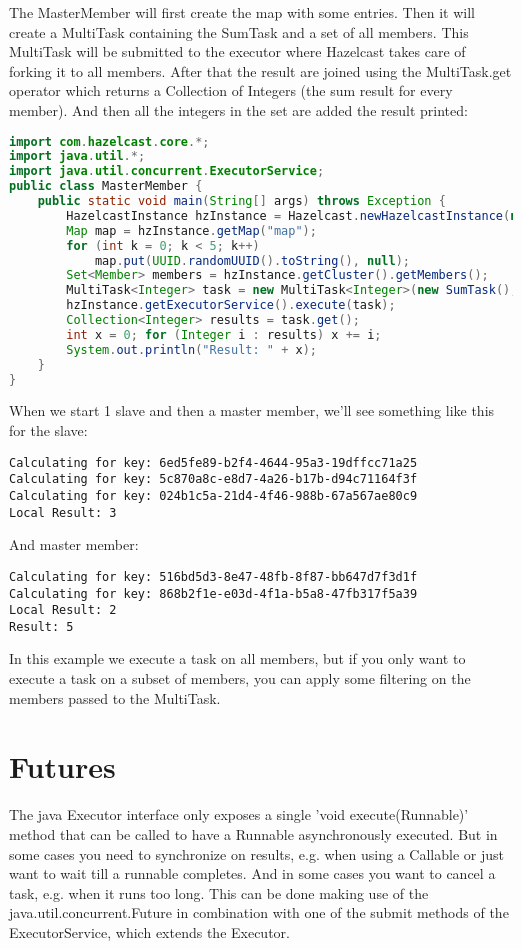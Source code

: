 The MasterMember will first create the map with some entries. Then it will create a MultiTask containing the SumTask and a set of all members. This MultiTask will be submitted to the executor where Hazelcast takes care of forking it to all members. After that the result are joined using the MultiTask.get operator which returns a Collection of Integers (the sum result for every member). And then all the integers in the set are added the result printed:
\begin{lstlisting}[language=java]
import com.hazelcast.core.*;
import java.util.*;
import java.util.concurrent.ExecutorService;
public class MasterMember {
    public static void main(String[] args) throws Exception {
        HazelcastInstance hzInstance = Hazelcast.newHazelcastInstance(null);
        Map map = hzInstance.getMap("map");
        for (int k = 0; k < 5; k++)
            map.put(UUID.randomUUID().toString(), null);
        Set<Member> members = hzInstance.getCluster().getMembers();
        MultiTask<Integer> task = new MultiTask<Integer>(new SumTask(), members);
        hzInstance.getExecutorService().execute(task);
        Collection<Integer> results = task.get();
        int x = 0; for (Integer i : results) x += i;
        System.out.println("Result: " + x);
    }
}
\end{lstlisting}
When we start 1 slave and then a master member, we'll see something like this for the slave:
\begin{lstlisting}
Calculating for key: 6ed5fe89-b2f4-4644-95a3-19dffcc71a25
Calculating for key: 5c870a8c-e8d7-4a26-b17b-d94c71164f3f
Calculating for key: 024b1c5a-21d4-4f46-988b-67a567ae80c9
Local Result: 3
\end{lstlisting}
And master member:
\begin{lstlisting}
Calculating for key: 516bd5d3-8e47-48fb-8f87-bb647d7f3d1f
Calculating for key: 868b2f1e-e03d-4f1a-b5a8-47fb317f5a39
Local Result: 2
Result: 5
\end{lstlisting}
In this example we execute a task on all members, but if you only want to execute a task on a subset of members, you can apply some filtering on the members passed to the MultiTask.

\section{Futures}
The java Executor interface only exposes a single 'void execute(Runnable)' method that can be called to have a Runnable asynchronously executed. But in some cases you need to synchronize on results, e.g. when using a Callable or just want to wait till a runnable completes. And in some cases you want to cancel a task, e.g. when it runs too long. This can be done making use of the java.util.concurrent.Future in combination with one of the submit methods of the ExecutorService, which extends the Executor.

